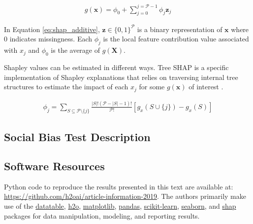 \documentclass[information,article,submit,moreauthors,pdftex]{definitions/mdpi}
\begin{document}
\begin{equation}
\label{eq:shap_additive}
\begin{aligned}
g(\mathbf{x}) = \phi_0 + \sum_{j=0}^{j=\mathcal{P} - 1} \phi_j \mathbf{z}_j
\end{aligned}
\end{equation}

\noindent In Equation \ref{eq:shap_additive}, $\mathbf{z} \in \{0,1\}^\mathcal{P}$ is a binary representation of $\mathbf{x}$ where 0 indicates missingness. Each $\phi_j$ is the local feature contribution value associated with $x_j$ and $\phi_0$ is the average of $g(\mathbf{X})$. 

Shapley values can be estimated in different ways. Tree SHAP is a specific implementation of Shapley explanations that relies on traversing internal tree structures to estimate the impact of each $x_j$ for some $g(\mathbf{x})$ of interest \cite{tree_shap}.

\begin{equation}
\label{eq:shap_contrib}
\begin{aligned}
\phi_{j} = \sum_{S \subseteq \mathcal{P} \setminus \{j\}}\frac{|S|!(\mathcal{P} -|S| -1)!}{\mathcal{P}!}[g_x(S \cup \{j\}) - g_x(S)]
\end{aligned}
\end{equation}

\subsection{Social Bias Test Description}\label{ssec:di}

\subsection{Software Resources}\label{ssec:soft}
Python code to reproduce the results presented in this text are available at: \url{https://github.com/h2oai/article-information-2019}. The authors primarily make use of the \href{https://github.com/h2oai/datatable}{datatable}, \href{https://github.com/h2oai/h2o-3}{h2o}, \href{https://matplotlib.org/}{matplotlib}, \href{https://pandas.pydata.org/}{pandas}, \href{https://scikit-learn.org/stable/}{scikit-learn}, \href{https://seaborn.pydata.org/}{seaborn}, and \href{https://github.com/slundberg/shap}{shap} packages for data manipulation, modeling, and reporting results. 
\end{document}
